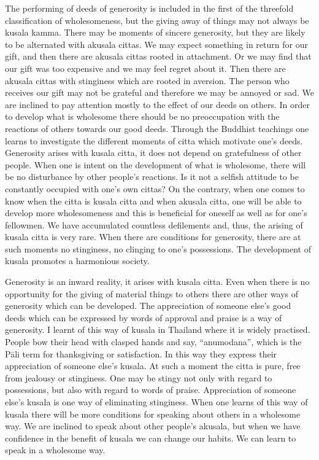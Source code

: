 \documentclass{book}
\begin{document}
The performing of deeds of generosity is included in the first of the
threefold classification of wholesomeness, but the giving away of things
may not always be kusala kamma. There may be moments of sincere
generosity, but they are likely to be alternated with akusala cittas. We
may expect something in return for our gift, and then there are akusala
cittas rooted in attachment. Or we may find that our gift was too
expensive and we may feel regret about it. Then there are akusala cittas
with stinginess which are rooted in aversion. The person who receives
our gift may not be grateful and therefore we may be annoyed or sad. We
are inclined to pay attention mostly to the effect of our deeds on
others. In order to develop what is wholesome there should be no
preoccupation with the reactions of others towards our good deeds.
Through the Buddhist teachings one learns to investigate the different
moments of citta which motivate one's deeds. Generosity arises with
kusala citta, it does not depend on gratefulness of other people. When
one is intent on the development of what is wholesome, there will be no
disturbance by other people's reactions. Is it not a selfish attitude to
be constantly occupied with one's own cittas? On the contrary, when one
comes to know when the citta is kusala citta and when akusala citta, one
will be able to develop more wholesomeness and this is beneficial for
oneself as well as for one's fellowmen. We have accumu­lated countless
defilements and, thus, the arising of kusala citta is very rare. When
there are conditions for generosity, there are at such moments no
stinginess, no clinging to one's possessions. The development of kusala
promotes a harmonious society.

Generosity is an inward reality, it arises with kusala citta. Even when
there is no opportunity for the giving of material things to others
there are other ways of generosity which can be developed. The
appreciation of someone else's good deeds which can be expressed by
words of approval and praise is a way of generosity. I learnt of this
way of kusala in Thailand where it is widely practised. People bow their
head with clasped hands and say, ``anumodana'', which is the Pāli term
for thanksgiving or satisfaction. In this way they express their
appreciation of someone else's kusala. At such a moment the citta is
pure, free from jealousy or stinginess. One may be stingy not only with
regard to possessions, but also with regard to words of praise.
Appreciation of someone else's kusala is one way of eliminating
stinginess. When one learns of this way of kusala there will be more
conditions for speaking about others in a wholesome way. We are inclined
to speak about other people's akusala, but when we have confidence in
the benefit of kusala we can change our habits. We can learn to speak in
a wholesome way.
\end{document}
